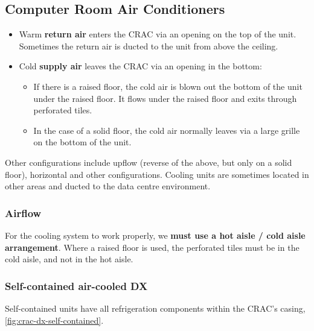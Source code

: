 \documentclass[slides]{pgnotes}
\begin{document}


\subsection{Computer Room Air Conditioners}

\begin{itemize}
\item Warm \textbf{return air} enters the CRAC via an opening on the top of the unit.
  Sometimes the return air is ducted to the unit from above the ceiling.
\item Cold \textbf{supply air} leaves the CRAC via an opening in the bottom:
  \begin{itemize}
  \item If there is a raised floor, the cold air is blown out the bottom of the unit under the raised floor.
    It flows under the raised floor and exits through perforated tiles.
  \item In the case of a solid floor, the cold air normally leaves via a large grille on the bottom of the unit.
  \end{itemize}
\end{itemize}
Other configurations include upflow (reverse of the above, but only on a solid floor), horizontal and other configurations.
Cooling units are sometimes located in other areas and ducted to the data centre environment.


\subsubsection{Airflow}

For the cooling system to work properly, we \textbf{must use a hot aisle / cold aisle arrangement}.
Where a raised floor is used, the perforated tiles must be in the cold aisle, and not in the hot aisle.


\subsubsection{Self-contained air-cooled DX}
\label{sec:self-contained-air-cooled-dx}

Self-contained units have all refrigeration components within the CRAC's casing, \autoref{fig:crac-dx-self-contained}.
\end{document}
